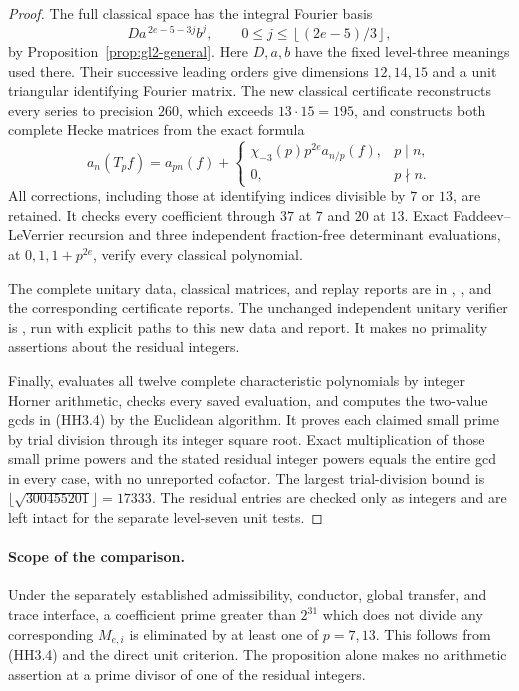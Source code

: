 \begin{proof}
The full classical space has the integral Fourier basis
\[
 Da^{\,2e-5-3j}b^j,\qquad
 0\le j\le\left\lfloor(2e-5)/3\right\rfloor ,
 \tag{HH3.7}
\]
by Proposition~\ref{prop:gl2-general}. Here \(D,a,b\) have
the fixed level-three meanings used there. Their successive
leading orders give dimensions \(12,14,15\) and a unit
triangular identifying Fourier matrix. The new classical
certificate reconstructs every series to precision \(260\),
which exceeds \(13\cdot15=195\), and constructs both complete
Hecke matrices from the exact formula
\[
 a_n(T_pf)=a_{pn}(f)+
 \begin{cases}
   \chi_{-3}(p)p^{2e}a_{n/p}(f),&p\mid n,\\
   0,&p\nmid n.
 \end{cases}
 \tag{HH3.8}
\]
All corrections, including those at identifying indices
divisible by \(7\) or \(13\), are retained.
It checks every coefficient through \(37\) at \(7\) and
\(20\) at \(13\). Exact Faddeev--LeVerrier recursion and
three independent fraction-free determinant evaluations,
at \(0,1,1+p^{2e}\), verify every classical polynomial.

The complete unitary data, classical matrices, and replay
reports are in
,
,
and the corresponding certificate reports.
The unchanged independent unitary verifier is
, run
with explicit paths to this new data and report.
It makes no primality assertions about the residual integers.

Finally,
evaluates all twelve complete characteristic polynomials
by integer Horner arithmetic, checks every saved evaluation,
and computes the two-value gcds in (HH3.4) by the Euclidean
algorithm. It proves each claimed small prime by trial division
through its integer square root. Exact multiplication of those
small prime powers and the stated residual integer powers
equals the entire gcd in every case, with no unreported
cofactor. The largest trial-division bound is
\(\lfloor\sqrt{300455201}\rfloor=17333\).
The residual entries are checked only as integers and are
left intact for the separate level-seven unit tests.
\end{proof}

\paragraph{Scope of the comparison.}
Under the separately established admissibility, conductor,
global transfer, and trace interface, a coefficient prime
greater than \(2^{31}\) which does not divide any corresponding
\(M_{e,i}\) is eliminated by at least one of \(p=7,13\).
This follows from (HH3.4) and the direct unit criterion.
The proposition alone makes no arithmetic assertion at
a prime divisor of one of the residual integers.
